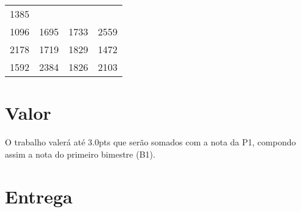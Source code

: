 \documentclass[a4paper]{article}
\begin{document}
\begin{longtable}[c]{@{}cccc@{}}
\begin{minipage}[t]{0.06\columnwidth}
1385
\strut\end{minipage}\tabularnewline
\begin{minipage}[t]{0.06\columnwidth}\centering\strut
1096
\strut\end{minipage} &
\begin{minipage}[t]{0.06\columnwidth}\centering\strut
1695
\strut\end{minipage} &
\begin{minipage}[t]{0.06\columnwidth}\centering\strut
1733
\strut\end{minipage} &
\begin{minipage}[t]{0.06\columnwidth}\centering\strut
2559
\strut\end{minipage}\tabularnewline
\begin{minipage}[t]{0.06\columnwidth}\centering\strut
2178
\strut\end{minipage} &
\begin{minipage}[t]{0.06\columnwidth}\centering\strut
1719
\strut\end{minipage} &
\begin{minipage}[t]{0.06\columnwidth}\centering\strut
1829
\strut\end{minipage} &
\begin{minipage}[t]{0.06\columnwidth}\centering\strut
1472
\strut\end{minipage}\tabularnewline
\begin{minipage}[t]{0.06\columnwidth}\centering\strut
1592
\strut\end{minipage} &
\begin{minipage}[t]{0.06\columnwidth}\centering\strut
2384
\strut\end{minipage} &
\begin{minipage}[t]{0.06\columnwidth}\centering\strut
1826
\strut\end{minipage} &
\begin{minipage}[t]{0.06\columnwidth}\centering\strut
2103
\strut\end{minipage}\tabularnewline
\bottomrule
\end{longtable}

\section{Valor}
O trabalho valerá até $3.0$pts que serão somados com a nota da P1, compondo assim a nota do primeiro bimestre (B1).

\section{Entrega}
\end{document}
